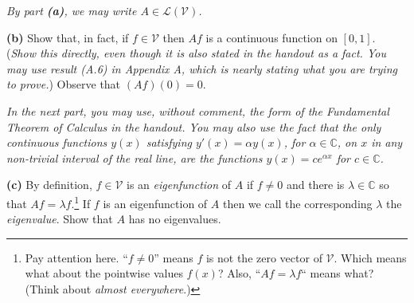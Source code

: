 \documentclass[12pt]{amsart}
\newcommand{\cL}{\mathcal{L}}
\newcommand{\cV}{\mathcal{V}}
\newcommand{\CC}{\mathbb{C}}
\newcommand{\epart}[1]{\medskip\noindent\textbf{(#1)}\quad }
\newcommand{\nex}{\medskip\noindent}
\begin{document}
\nex \emph{By part \emph{\textbf{(a)}}, we may write $A\in\cL(\cV)$.}

\medskip
\epart{b}  Show that, in fact, if $f\in \cV$ then $Af$ is a continuous function on $[0,1]$.  (\emph{Show this directly, even though it is also stated in the handout as a fact.  You may use result (A.6) in Appendix A, which is nearly stating what you are trying to prove.})  Observe that $(Af)(0)=0$.

\nex \emph{In the next part, you may use, without comment, the form of the Fundamental Theorem of Calculus in the handout.  You may also use the fact that the only continuous functions $y(x)$ satisfying $y'(x) = \alpha y(x)$, for $\alpha\in\CC$, on $x$ in any non-trivial interval of the real line, are the functions $y(x) = c e^{\alpha x}$ for $c\in\CC$.}

\medskip

\epart{c}  By definition, $f \in \cV$ is an \emph{eigenfunction} of $A$ if $f\ne 0$ and there is $\lambda \in \CC$ so that $Af=\lambda f$.\footnote{Pay attention here. ``$f\ne 0$'' means $f$ is not the zero vector of $\cV$.  Which means what about the pointwise values $f(x)$?  Also, ``$Af=\lambda f$`` means what?  (Think about \emph{almost everywhere}.)}  If $f$ is an eigenfunction of $A$ then we call the corresponding $\lambda$ the \emph{eigenvalue}.  Show that $A$ has no eigenvalues.
\end{document}
